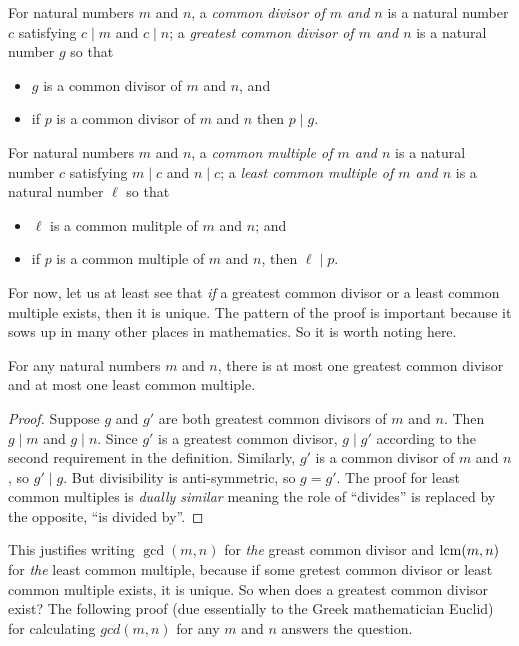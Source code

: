 \begin{defn}
  For natural numbers $m$ and $n$, a \emph{common divisor of $m$
    and $n$} is a natural number $c$ satisfying $c\mid m$ and $c\mid n$;
   a  \emph{greatest common divisor of $m$ and $n$} is a natural number $g$ so that
  \begin{itemize}
  \item $g$ is a common divisor of $m$ and $n$, and
  \item if $p$ is a common divisor of $m$ and $n$
    then $p\mid g$.
  \end{itemize}

  For natural numbers $m$ and $n$, a \emph{common multiple of $m$ and
    $n$} is a natural number $c$ satisfying $m\mid c$ and $n\mid c$;
    a \emph{least common multiple of $m$ and $n$} is a natural number $\ell$ so that
  \begin{itemize}
  \item $\ell$ is a common mulitple of $m$ and $n$; and
  \item if $p$ is a common multiple of $m$ and $n$,
    then $\ell\mid p$.
  \end{itemize}
\end{defn}

For now, let us at least see that \emph{if} a greatest common divisor or a least common multiple exists, then it is unique. The pattern of the proof is important because it sows up in many other places in mathematics. So it is worth noting here.

\begin{lemma}
  For any natural numbers $m$ and $n$, there is at most one greatest common divisor
and at most one least common multiple.

\begin{proof}
 Suppose $g$ and $g'$ are both greatest common divisors of $m$ and $n$. Then $g\mid m$ and $g\mid n$. Since $g'$ is a greatest common divisor, $g\mid g'$ according to the second requirement in the definition. Similarly, $g'$ is a common divisor of $m$ and $n$, so $g'\mid g$. But divisibility
is anti-symmetric, so $g=g'$. The proof for least common multiples is \emph{dually similar} meaning the role of ``divides'' is replaced by the opposite, ``is divided by''.
\end{proof}
\end{lemma}

This justifies writing $\gcd(m,n)$ for \emph{the} greast common divisor and $\operatorname{lcm}(m,n)$ for \emph{the} least common multiple, because if some gretest common divisor or least common multiple exists, it is unique. So when does a greatest common divisor exist? The following proof (due essentially to the Greek mathematician Euclid) for calculating $gcd(m,n)$ for any $m$ and $n$ answers the question.


